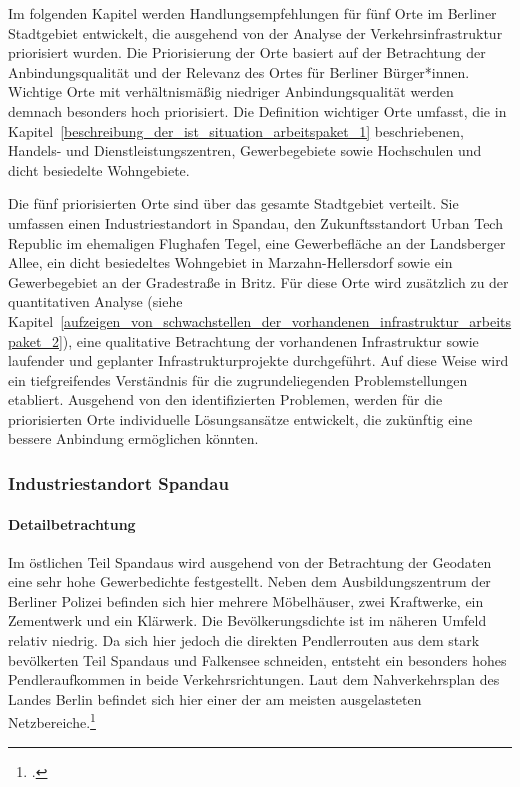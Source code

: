 Im folgenden Kapitel werden Handlungsempfehlungen für fünf Orte im Berliner Stadtgebiet entwickelt, die  ausgehend von der Analyse der Verkehrsinfrastruktur priorisiert wurden. Die Priorisierung der Orte basiert auf der Betrachtung der Anbindungsqualität und der Relevanz des Ortes für Berliner Bürger*innen. Wichtige Orte mit verhältnismäßig niedriger Anbindungsqualität werden demnach besonders hoch priorisiert. Die Definition wichtiger Orte umfasst, die in Kapitel~\ref{beschreibung_der_ist_situation_arbeitspaket_1} beschriebenen, Handels- und Dienstleistungszentren, Gewerbegebiete sowie Hochschulen und dicht besiedelte Wohngebiete.

Die fünf priorisierten Orte sind über das gesamte Stadtgebiet verteilt. Sie umfassen einen Industriestandort in Spandau, den Zukunftsstandort Urban Tech Republic im ehemaligen Flughafen Tegel, eine Gewerbefläche an der Landsberger Allee, ein dicht besiedeltes Wohngebiet in Marzahn-Hellersdorf sowie ein Gewerbegebiet an der Gradestraße in Britz. Für diese Orte wird zusätzlich zu der quantitativen Analyse (siehe Kapitel~\ref{aufzeigen_von_schwachstellen_der_vorhandenen_infrastruktur_arbeitspaket_2}), eine qualitative Betrachtung der vorhandenen Infrastruktur sowie laufender und geplanter Infrastrukturprojekte durchgeführt. Auf diese Weise wird ein tiefgreifendes Verständnis für die zugrundeliegenden Problemstellungen etabliert. Ausgehend von den identifizierten Problemen, werden für die priorisierten Orte individuelle Lösungsansätze entwickelt, die zukünftig eine bessere Anbindung ermöglichen könnten.

\subsubsection{Industriestandort Spandau}

\paragraph{Detailbetrachtung}

Im östlichen Teil Spandaus wird ausgehend von der Betrachtung der Geodaten eine sehr hohe Gewerbedichte festgestellt. Neben dem Ausbildungszentrum der Berliner Polizei befinden sich hier mehrere Möbelhäuser, zwei Kraftwerke, ein Zementwerk und ein Klärwerk. Die Bevölkerungsdichte ist im näheren Umfeld relativ niedrig. Da sich hier jedoch die direkten Pendlerrouten aus dem stark bevölkerten Teil Spandaus und Falkensee schneiden, entsteht ein besonders hohes Pendleraufkommen in beide Verkehrsrichtungen. Laut dem Nahverkehrsplan des Landes Berlin befindet sich hier einer der am meisten ausgelasteten Netzbereiche.\footcite{NahverkehrsplanBerlin}

